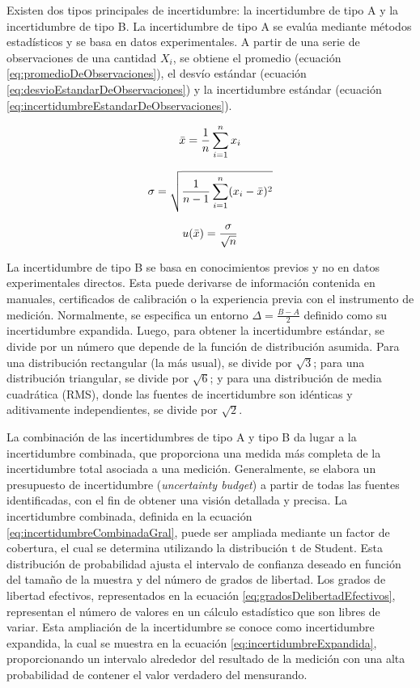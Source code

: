 Existen dos tipos principales de incertidumbre: la incertidumbre de tipo A y la incertidumbre de tipo B. La incertidumbre de tipo A se evalúa mediante métodos estadísticos y se basa en datos experimentales. A partir de una serie de observaciones de una cantidad $X_{i}$, se obtiene el promedio (ecuación \ref{eq:promedioDeObservaciones}), el desvío estándar (ecuación \ref{eq:desvioEstandarDeObservaciones}) y la incertidumbre estándar (ecuación \ref{eq:incertidumbreEstandarDeObservaciones}).


\begin{equation}
    \centering
    \bar{x} = \frac{1}{n}\sum_{i=1}^{n} x_{i}
    \label{eq:promedioDeObservaciones}
\end{equation}

\begin{equation}
    \centering
    \sigma = \sqrt{\frac{1}{n-1} \sum_{i=1}^{n} (x_i - \bar{x})^2}
    \label{eq:desvioEstandarDeObservaciones}
\end{equation}

\begin{equation}
    \centering
    u(\bar{x}) = \frac{\sigma}{\sqrt{n}}
    \label{eq:incertidumbreEstandarDeObservaciones}
\end{equation}

La incertidumbre de tipo B se basa en conocimientos previos y no en datos experimentales directos. Esta puede derivarse de información contenida en manuales, certificados de calibración o la experiencia previa con el instrumento de medición. Normalmente, se especifica un entorno $\Delta = \frac{B-A}{2}$ definido como su incertidumbre expandida. Luego, para obtener la incertidumbre estándar, se divide por un número que depende de la función de distribución asumida. Para una distribución rectangular (la más usual), se divide por $\sqrt{3}$; para una distribución triangular, se divide por $\sqrt{6}$; y para una distribución de media cuadrática (RMS), donde las fuentes de incertidumbre son idénticas y aditivamente independientes, se divide por $\sqrt{2}$.

La combinación de las incertidumbres de tipo A y tipo B da lugar a la incertidumbre combinada, que proporciona una medida más completa de la incertidumbre total asociada a una medición. Generalmente, se elabora un presupuesto de incertidumbre (\textit{uncertainty budget}) a partir de todas las fuentes identificadas, con el fin de obtener una visión detallada y precisa. La incertidumbre combinada, definida en la ecuación \ref{eq:incertidumbreCombinadaGral}, puede ser ampliada mediante un factor de cobertura, el cual se determina utilizando la distribución t de Student. Esta distribución de probabilidad ajusta el intervalo de confianza deseado en función del tamaño de la muestra y del número de grados de libertad. Los grados de libertad efectivos, representados en la ecuación \ref{eq:gradosDelibertadEfectivos}, representan el número de valores en un cálculo estadístico que son libres de variar. Esta ampliación de la incertidumbre se conoce como incertidumbre expandida, la cual se muestra en la ecuación \ref{eq:incertidumbreExpandida}, proporcionando un intervalo alrededor del resultado de la medición con una alta probabilidad de contener el valor verdadero del mensurando.

